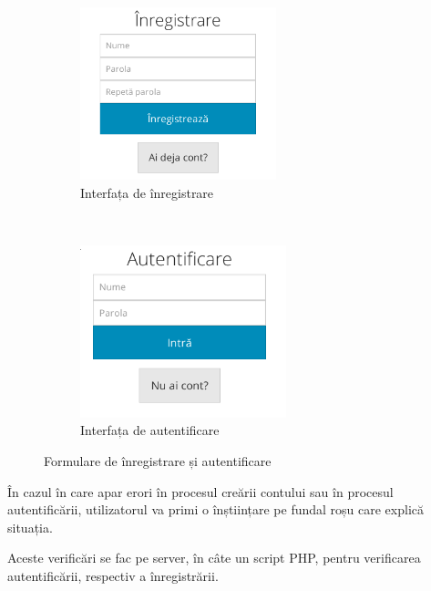 \documentclass[12pt,a4paper]{article}
\begin{document}
\begin{figure}[h!]
        \centering
        \begin{subfigure}[b]{0.45\textwidth}
                \includegraphics[height=5cm]{img/inreg.png}
                \caption{Interfața de înregistrare}
        \end{subfigure}%
        ~ \qquad 
        \begin{subfigure}[b]{0.45\textwidth}
                \includegraphics[height=5cm]{img/auth.png}
                \caption{Interfața de autentificare}
        \end{subfigure}
        \caption{Formulare de înregistrare și autentificare}%
\end{figure}

 

În cazul  în care apar erori în procesul creării contului sau în procesul autentificării,
utilizatorul va primi o înștiințare pe fundal roșu care explică situația.

Aceste verificări se fac pe server,  în câte un script PHP, pentru verificarea autentificării, respectiv a înregistrării. 
\end{document}
